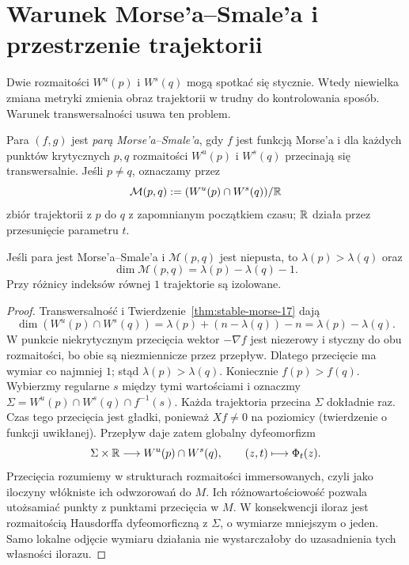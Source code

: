 \section{Warunek Morse'a--Smale'a i przestrzenie trajektorii}
\label{sec:morse-smale-17}

Dwie rozmaitości $W^u(p)$ i $W^s(q)$
mogą spotkać się stycznie. Wtedy
niewielka zmiana metryki zmienia
obraz trajektorii w trudny do
kontrolowania sposób. Warunek
transwersalności usuwa ten problem.

\begin{definicja}
\label{def:ms-17}
Para $(f,g)$ jest \emph{parą Morse'a--Smale'a},
gdy $f$ jest funkcją Morse'a
i dla każdych punktów krytycznych
$p,q$ rozmaitości $W^u(p)$ i $W^s(q)$
przecinają się transwersalnie.
Jeśli $p\ne q$, oznaczamy przez
\[
 \mathcal M(p,q)
 :=(W^u(p)\cap W^s(q))/\mathbb{R}
\]
zbiór trajektorii z $p$ do $q$
z zapomnianym początkiem czasu;
$\mathbb{R}$ działa przez przesunięcie
parametru $t$.
\end{definicja}

\begin{stwierdzenie}
\label{prop:wymiar-ms-17}
Jeśli para jest Morse'a--Smale'a
i $\mathcal M(p,q)$ jest niepusta,
to $\lambda(p)>\lambda(q)$ oraz
\[
 \dim\mathcal M(p,q)
    =\lambda(p)-\lambda(q)-1.
\]
Przy różnicy indeksów równej $1$
trajektorie są izolowane.
\end{stwierdzenie}
\begin{proof}
Transwersalność i
Twierdzenie~\ref{thm:stable-morse-17}
dają
\[
 \dim(W^u(p)\cap W^s(q))
 =\lambda(p)+(n-\lambda(q))-n
 =\lambda(p)-\lambda(q).
\]
W punkcie niekrytycznym przecięcia
wektor $-\nabla f$ jest niezerowy
i styczny do obu rozmaitości,
bo obie są niezmiennicze
przez przepływ. Dlatego
przecięcie ma wymiar co
najmniej $1$; stąd
$\lambda(p)>\lambda(q)$.
Koniecznie $f(p)>f(q)$. Wybierzmy regularne
$s$ między tymi wartościami i oznaczmy
$\Sigma=W^u(p)\cap W^s(q)\cap f^{-1}(s)$.
Każda trajektoria przecina $\Sigma$ dokładnie raz.
Czas tego przecięcia jest gładki, ponieważ
$Xf\ne0$ na poziomicy (twierdzenie o funkcji uwikłanej).
Przepływ daje zatem globalny dyfeomorfizm
\[
 \Sigma\times\mathbb{R}\longrightarrow W^u(p)\cap W^s(q),
 \qquad (z,t)\longmapsto\Phi_t(z).
\]
Przecięcia rozumiemy w strukturach rozmaitości
immersowanych, czyli jako iloczyny włókniste ich
odwzorowań do $M$. Ich różnowartościowość pozwala
utożsamiać punkty z punktami przecięcia w $M$.
W konsekwencji iloraz jest rozmaitością Hausdorffa
dyfeomorficzną z $\Sigma$, o wymiarze mniejszym o jeden.
Samo lokalne odjęcie wymiaru działania nie
wystarczałoby do uzasadnienia tych własności ilorazu.
\end{proof}

